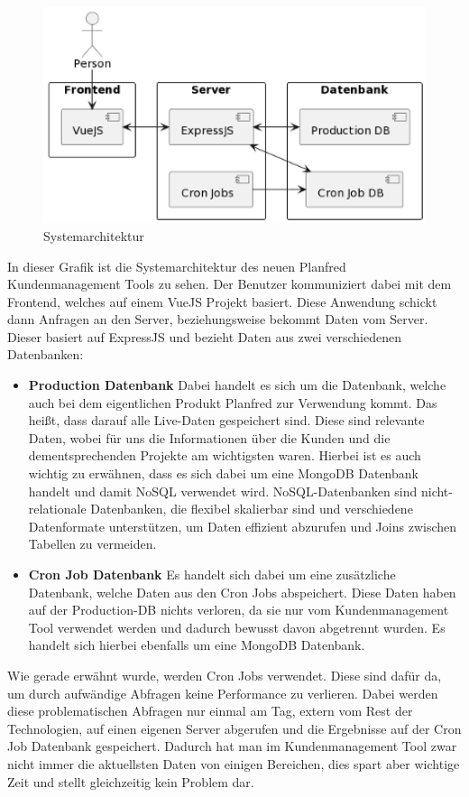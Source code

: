 \begin{figure}[h!]
    \centering
    \includegraphics[width=1\textwidth]{pics/diplomarbeit-architektur.png}
    \caption{Systemarchitektur}
    \label{fig:mesh1}
\end{figure}

In dieser Grafik ist die Systemarchitektur des neuen Planfred Kundenmanagement Tools zu sehen. Der Benutzer kommuniziert dabei mit dem Frontend, welches auf einem VueJS Projekt basiert. Diese Anwendung schickt dann Anfragen an den Server, beziehungsweise bekommt Daten vom Server. Dieser basiert auf ExpressJS und bezieht Daten aus zwei verschiedenen Datenbanken:

\begin{itemize}
    \item \textbf{Production Datenbank}
        \newline
        Dabei handelt es sich um die Datenbank, welche auch bei dem eigentlichen Produkt Planfred zur Verwendung kommt. Das heißt, dass darauf alle Live-Daten gespeichert sind. Diese sind relevante Daten, wobei für uns die Informationen über die Kunden und die dementsprechenden Projekte am wichtigsten waren.
        Hierbei ist es auch wichtig zu erwähnen, dass es sich dabei um eine MongoDB Datenbank handelt und damit NoSQL verwendet wird. 
        NoSQL-Datenbanken sind nicht-relationale Datenbanken, die flexibel skalierbar sind und verschiedene Datenformate unterstützen, um Daten effizient abzurufen und Joins zwischen Tabellen zu vermeiden.
        \cite{no_sql}
    \item \textbf{Cron Job Datenbank}
        \newline
        Es handelt sich dabei um eine zusätzliche Datenbank, welche Daten aus den Cron Jobs abspeichert. Diese Daten haben auf der Production-DB nichts verloren, da sie nur vom Kundenmanagement Tool verwendet werden und dadurch bewusst davon abgetrennt wurden.
        Es handelt sich hierbei ebenfalls um eine MongoDB Datenbank.
\end{itemize}

Wie gerade erwähnt wurde, werden Cron Jobs verwendet. Diese sind dafür da, um durch aufwändige Abfragen keine Performance zu verlieren. Dabei werden diese problematischen Abfragen nur einmal am Tag, extern vom Rest der Technologien, auf einen eigenen Server abgerufen und die Ergebnisse auf der Cron Job Datenbank gespeichert. Dadurch hat man im Kundenmanagement Tool zwar nicht immer die aktuellsten Daten von einigen Bereichen, dies spart aber wichtige Zeit und stellt gleichzeitig kein Problem dar.
